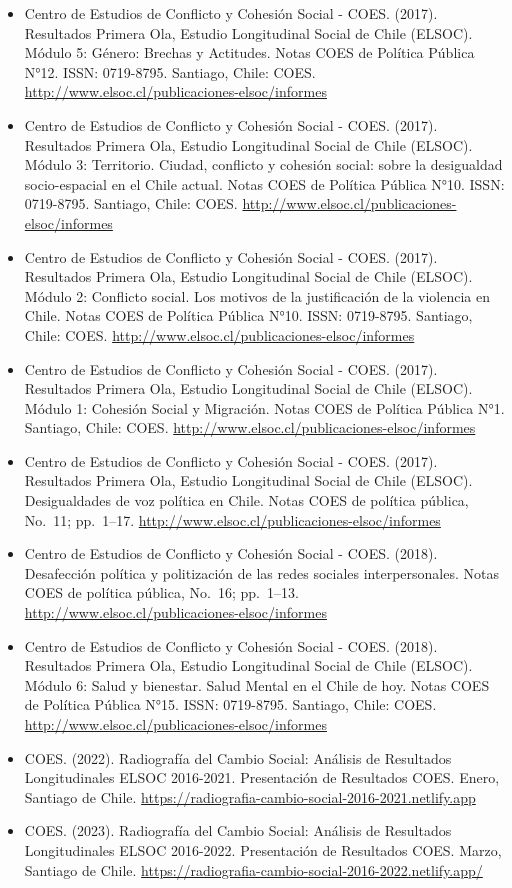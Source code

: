 \documentclass[
  12pt,
]{article}
\providecommand{\tightlist}{%
  \setlength{\itemsep}{0pt}\setlength{\parskip}{0pt}}
\begin{document}
\begin{itemize}
\tightlist
\item
  Centro de Estudios de Conflicto y Cohesión Social - COES. (2017). Resultados Primera Ola, Estudio Longitudinal Social de Chile (ELSOC). Módulo 5: Género: Brechas y Actitudes. Notas COES de Política Pública N°12. ISSN: 0719-8795. Santiago, Chile: COES. \url{http://www.elsoc.cl/publicaciones-elsoc/informes}
\item
  Centro de Estudios de Conflicto y Cohesión Social - COES. (2017). Resultados Primera Ola, Estudio Longitudinal Social de Chile (ELSOC). Módulo 3: Territorio. Ciudad, conflicto y cohesión social: sobre la desigualdad socio-espacial en el Chile actual. Notas COES de Política Pública N°10. ISSN: 0719-8795. Santiago, Chile: COES. \url{http://www.elsoc.cl/publicaciones-elsoc/informes}
\item
  Centro de Estudios de Conflicto y Cohesión Social - COES. (2017). Resultados Primera Ola, Estudio Longitudinal Social de Chile (ELSOC). Módulo 2: Conflicto social. Los motivos de la justificación de la violencia en Chile. Notas COES de Política Pública N°10. ISSN: 0719-8795. Santiago, Chile: COES. \url{http://www.elsoc.cl/publicaciones-elsoc/informes}
\item
  Centro de Estudios de Conflicto y Cohesión Social - COES. (2017). Resultados Primera Ola, Estudio Longitudinal Social de Chile (ELSOC). Módulo 1: Cohesión Social y Migración. Notas COES de Política Pública N°1. Santiago, Chile: COES. \url{http://www.elsoc.cl/publicaciones-elsoc/informes}
\item
  Centro de Estudios de Conflicto y Cohesión Social - COES. (2017). Resultados Primera Ola, Estudio Longitudinal Social de Chile (ELSOC). Desigualdades de voz política en Chile. Notas COES de política pública, No.~11; pp.~1--17. \url{http://www.elsoc.cl/publicaciones-elsoc/informes}
\item
  Centro de Estudios de Conflicto y Cohesión Social - COES. (2018). Desafección política y politización de las redes sociales interpersonales. Notas COES de política pública, No.~16; pp.~1--13. \url{http://www.elsoc.cl/publicaciones-elsoc/informes}
\item
  Centro de Estudios de Conflicto y Cohesión Social - COES. (2018). Resultados Primera Ola, Estudio Longitudinal Social de Chile (ELSOC). Módulo 6: Salud y bienestar. Salud Mental en el Chile de hoy. Notas COES de Política Pública N°15. ISSN: 0719-8795. Santiago, Chile: COES. \url{http://www.elsoc.cl/publicaciones-elsoc/informes}
\item
  COES. (2022). Radiografía del Cambio Social: Análisis de Resultados Longitudinales ELSOC 2016-2021. Presentación de Resultados COES. Enero, Santiago de Chile. \url{https://radiografia-cambio-social-2016-2021.netlify.app}
\item
  COES. (2023). Radiografía del Cambio Social: Análisis de Resultados Longitudinales ELSOC 2016-2022. Presentación de Resultados COES. Marzo, Santiago de Chile. \url{https://radiografia-cambio-social-2016-2022.netlify.app/}
\end{itemize}

\newpage
\end{document}
